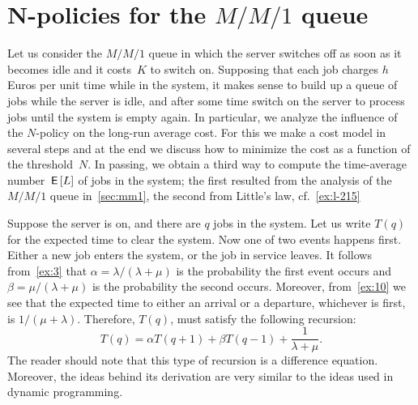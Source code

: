 
\section{N-policies for the $M/M/1$ queue}
\label{sec:n-policies}


Let us consider the $M/M/1$ queue in which the server switches off as soon as it becomes idle and it costs~$K$ to switch on.
Supposing that each job charges $h$ Euros per unit time while in the system, it makes sense to build up a queue of jobs while the server is idle, and after some time switch on the server to process jobs until the system is empty again.
In particular, we analyze the influence of the $N$-policy on the long-run average cost.
For this we make a cost model in several steps and at the end we discuss how to minimize the cost as a function of the threshold~$N$.
In passing, we obtain a third way to compute the time-average number $\,\mathsf{E}\left[L\right]$ of jobs in the system; the first resulted from the analysis of the $M/M/1$ queue in~\cref{sec:mm1}, the second from Little's law, cf.~\cref{ex:l-215}




Suppose the server is on, and there are $q$ jobs in the system.
Let us write $T(q)$ for the expected time to clear the system.
Now one of two events happens first.
Either a new job enters the system, or the job in service leaves.
It follows from~\cref{ex:3} that $\alpha=\lambda/(\lambda+\mu)$ is the probability the first event occurs and $\beta=\mu/(\lambda+\mu)$ is the probability the second occurs.
Moreover, from~\cref{ex:10} we see that the expected time to either an arrival or a departure, whichever is first, is $1/(\mu+\lambda)$.
Therefore, $T(q)$, must satisfy the following recursion:
\begin{equation}
  \label{eq:92}
  T(q) = \alpha T(q+1) + \beta T(q-1) + \frac{1}{\lambda+\mu}. 
\end{equation}
The reader should note that this type of recursion is a difference equation.
Moreover, the ideas behind its derivation are very similar to the ideas used in dynamic programming.

